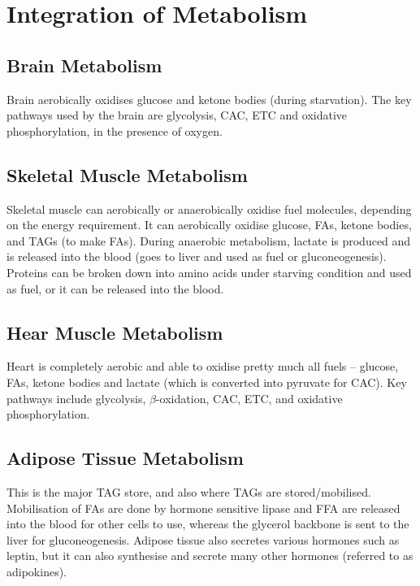 \section{Integration of Metabolism}

\subsection{Brain Metabolism}

Brain aerobically oxidises glucose and ketone bodies (during starvation).
The key pathways used by the brain are glycolysis, CAC, ETC and oxidative phosphorylation, in the presence of oxygen.

\subsection{Skeletal Muscle Metabolism}

Skeletal muscle can aerobically or anaerobically oxidise fuel molecules, depending on the energy requirement.
It can aerobically oxidise glucose, FAs, ketone bodies, and TAGs (to make FAs).
During anaerobic metabolism, lactate is produced and is released into the blood (goes to liver and used as fuel or gluconeogenesis).
Proteins can be broken down into amino acids under starving condition and used as fuel, or it can be released into the blood.

\subsection{Hear Muscle Metabolism}

Heart is completely aerobic and able to oxidise pretty much all fuels -- glucose, FAs, ketone bodies and lactate (which is converted into pyruvate for CAC).
Key pathways include glycolysis, $\beta$-oxidation, CAC, ETC, and oxidative phosphorylation.

\subsection{Adipose Tissue Metabolism}

This is the major TAG store, and also where TAGs are stored/mobilised.
Mobilisation of FAs are done by hormone sensitive lipase and FFA are released into the blood for other cells to use, whereas the glycerol backbone is sent to the liver for gluconeogenesis.
Adipose tissue also secretes various hormones such as leptin, but it can also synthesise and secrete many other hormones (referred to as adipokines).

